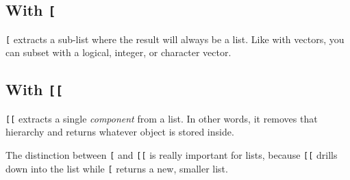 \documentclass[]{book}
\newenvironment{Shaded}{\begin{snugshade}}{\end{snugshade}}
\newcommand{\KeywordTok}[1]{\textcolor[rgb]{0.13,0.29,0.53}{\textbf{#1}}}
\newcommand{\DecValTok}[1]{\textcolor[rgb]{0.00,0.00,0.81}{#1}}
\newcommand{\CommentTok}[1]{\textcolor[rgb]{0.56,0.35,0.01}{\textit{#1}}}
\newcommand{\OperatorTok}[1]{\textcolor[rgb]{0.81,0.36,0.00}{\textbf{#1}}}
\newcommand{\NormalTok}[1]{#1}
\begin{document}
\subsection{\texorpdfstring{With \texttt{{[}}}{With {[}}}\label{with}

\texttt{{[}} extracts a sub-list where the result will always be a list.
Like with vectors, you can subset with a logical, integer, or character
vector.

\begin{Shaded}
\end{Shaded}

\subsection{\texorpdfstring{With
\texttt{{[}{[}}}{With {[}{[}}}\label{with-1}

\texttt{{[}{[}} extracts a single \emph{component} from a list. In other
words, it removes that hierarchy and returns whatever object is stored
inside.

\begin{Shaded}
\end{Shaded}

The distinction between \texttt{{[}} and \texttt{{[}{[}} is really
important for lists, because \texttt{{[}{[}} drills down into the list
while \texttt{{[}} returns a new, smaller list.
\end{document}
